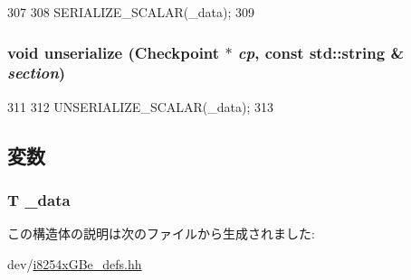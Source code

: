 \begin{DoxyCode}
307         {
308             SERIALIZE_SCALAR(_data);
309         }
\end{DoxyCode}
\hypertarget{structiGbReg_1_1Regs_1_1Reg_af22e5d6d660b97db37003ac61ac4ee49}{
\subsubsection[{unserialize}]{\setlength{\rightskip}{0pt plus 5cm}void unserialize ({\bf Checkpoint} $\ast$ {\em cp}, \/  const std::string \& {\em section})}}
\label{structiGbReg_1_1Regs_1_1Reg_af22e5d6d660b97db37003ac61ac4ee49}



\begin{DoxyCode}
311         {
312             UNSERIALIZE_SCALAR(_data);
313         }
\end{DoxyCode}


\subsection{変数}
\hypertarget{structiGbReg_1_1Regs_1_1Reg_a57c5c9d30605c3947f4972fb48761bee}{
\subsubsection[{\_\-data}]{\setlength{\rightskip}{0pt plus 5cm}T {\bf \_\-data}}}
\label{structiGbReg_1_1Regs_1_1Reg_a57c5c9d30605c3947f4972fb48761bee}


この構造体の説明は次のファイルから生成されました:\begin{DoxyCompactItemize}
\item 
dev/\hyperlink{i8254xGBe__defs_8hh}{i8254xGBe\_\-defs.hh}\end{DoxyCompactItemize}
